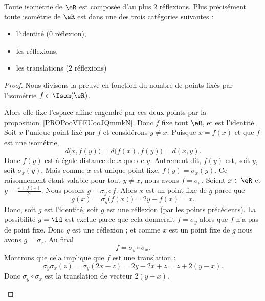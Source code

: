 \begin{theorem}
	Toute isométrie de \( \eR\) est composée d'au plus \( 2\) réflexions. Plus précisément toute isométrie de \( \eR\) est dans une des trois catégories suivantes :
	\begin{itemize}
		\item l'identité (\( 0\) réflexion),
		\item les réflexions,
		\item les translations (\( 2\) réflexions)
	\end{itemize}
\end{theorem}

\begin{proof}
	Nous divisons la preuve en fonction du nombre de points fixés par l'isométrie \( f\in\Isom(\eR)\).
	\begin{subproof}
		Alors elle fixe l'espace affine engendré par ces deux points par la proposition~\ref{PROPooVEEUooJQmmkN}. Donc \( f\) fixe tout \( \eR\), et est l'identité.
		Soit \( x\) l'unique point fixé par \( f\) et considérons \( y\neq x\). Puisque \( x=f(x)\) et que \( f\) est une isométrie,
		\begin{equation}
			d\big( x,f(y) \big)=d\big( f(x),f(y) \big)=d(x,y).
		\end{equation}
		Donc \( f(y)\) est à égale distance de \( x\) que de \( y\). Autrement dit, \( f(y)\) est, soit \( y\), soit \( \sigma_x(y)\). Mais comme \( x\) est unique point fixe, \( f(y)=\sigma_x(y)\). Ce raisonnement étant valable pour tout \( y\neq x \), nous avons \( f=\sigma_x\).
		Soient \( x\in \eR\) et \( y=\frac{ x+f(x) }{ 2 }\). Nous posons \( g=\sigma_y\circ f\). Alors \( x\) est un point fixe de \( g\) parce que
		\begin{equation}
			g(x)=\sigma_y\big( f(x) \big)=2y-f(x)=x.
		\end{equation}
		Donc, soit \( g\) est l'identité, soit \( g\) est une réflexion (par les points précédents). La possibilité \( g=\id\) est exclue parce que cela donnerait \( f=\sigma_y\) alors que \( f\) n'a pas de point fixe. Donc \( g\) est une réflexion ; et comme \( x\) est un point fixe de \( g\) nous avons \( g=\sigma_x\). Au final
		\begin{equation}
			f=\sigma_y\circ\sigma_x.
		\end{equation}
		Montrons que cela implique que \( f\) est une translation :
		\begin{equation}
			\sigma_y\sigma_x(z)=\sigma_y(2x-z)=2y-2x+z=z+2(y-x).
		\end{equation}
		Donc \( \sigma_y\circ\sigma_x\) est la translation de vecteur \( 2(y-x)\).
	\end{subproof}
\end{proof}

